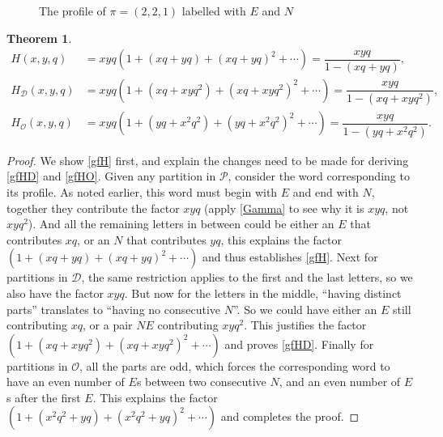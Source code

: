 \documentclass[12pt]{amsart}
\numberwithin{equation}{section}
\theoremstyle{plain}
\newtheorem{theorem}{Theorem}[section]
\theoremstyle{definition}
\def\D{\mathcal{D}}
\def\O{\mathcal{O}}
\def\P{\mathcal{P}}
\begin{document}
\begin{figure}
\caption{The profile of $\pi=(2,2,1)$ labelled with $E$ and $N$}
\label{profile}
\end{figure}

\begin{theorem}\label{gfxyq}
\begin{align}
H(x,y,q) &= xyq(1+(xq+yq)+(xq+yq)^2+\cdots)=\dfrac{xyq}{1-(xq+yq)},\label{gfH}\\
H_{\D}(x,y,q) &= xyq(1+(xq+xyq^2)+(xq+xyq^2)^2+\cdots)=\dfrac{xyq}{1-(xq+xyq^2)},\label{gfHD}\\
H_{\O}(x,y,q) &= xyq(1+(yq+x^2q^2)+(yq+x^2q^2)^2+\cdots)=\dfrac{xyq}{1-(yq+x^2q^2)}\label{gfHO}.
\end{align}
\end{theorem}
\begin{proof}
We show \eqref{gfH} first, and explain the changes need to be made for deriving \eqref{gfHD} and \eqref{gfHO}. Given any partition in $\P$, consider the word corresponding to its profile. As noted earlier, this word must begin with $E$ and end with $N$, together they contribute the factor $xyq$ (apply \eqref{Gamma} to see why it is $xyq$, not $xyq^2$). And all the remaining letters in between could be either an $E$ that contributes $xq$, or an $N$ that contributes $yq$, this explains the factor $(1+(xq+yq)+(xq+yq)^2+\cdots)$ and thus establishes \eqref{gfH}. Next for partitions in $\D$, the same restriction applies to the first and the last letters, so we also have the factor $xyq$. But now for the letters in the middle, ``having distinct parts'' translates to ``having no consecutive $N$''. So we could have either an $E$ still contributing $xq$, or a pair $NE$ contributing $xyq^2$. This justifies the factor $(1+(xq+xyq^2)+(xq+xyq^2)^2+\cdots)$ and proves \eqref{gfHD}. Finally for partitions in $\O$, all the parts are odd, which forces the corresponding word to have an even number of $E$s between two consecutive $N$, and an even number of $E$s after the first $E$. This explains the factor $(1+(x^2q^2+yq)+(x^2q^2+yq)^2+\cdots)$ and completes the proof.
\end{proof}
\end{document}
